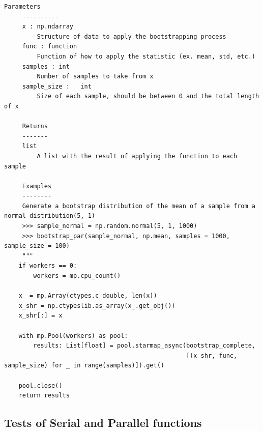 \documentclass[11pt]{article}
\begin{document}
\begin{Verbatim}[fontsize=\tiny]
     Parameters
     ----------
     x : np.ndarray
         Structure of data to apply the bootstrapping process
     func : function
         Function of how to apply the statistic (ex. mean, std, etc.)
     samples : int
         Number of samples to take from x
     sample_size :   int
         Size of each sample, should be between 0 and the total length of x

     Returns
     -------
     list
         A list with the result of applying the function to each sample

     Examples
     --------
     Generate a bootstrap distribution of the mean of a sample from a normal distribution(5, 1)
     >>> sample_normal = np.random.normal(5, 1, 1000)
     >>> bootstrap_par(sample_normal, np.mean, samples = 1000, sample_size = 100)
     """
    if workers == 0:
        workers = mp.cpu_count()

    x_ = mp.Array(ctypes.c_double, len(x))
    x_shr = np.ctypeslib.as_array(x_.get_obj())
    x_shr[:] = x

    with mp.Pool(workers) as pool:
        results: List[float] = pool.starmap_async(bootstrap_complete,
                                                  [(x_shr, func, sample_size) for _ in range(samples)]).get()

    pool.close()
    return results

\end{Verbatim}


\subsection{Tests of Serial and Parallel functions}
\end{document}
